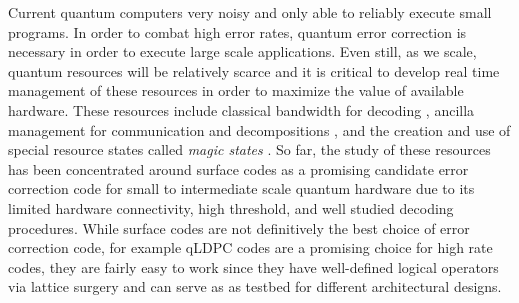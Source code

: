 Current quantum computers very noisy and only able to reliably execute small programs. In order to combat high error rates, quantum error correction is necessary in order to execute large scale applications. Even still, as we scale, quantum resources will be relatively scarce and it is critical to develop real time management of these resources in order to maximize the value of available hardware. These resources include classical bandwidth for decoding \cite{ravi2023better}, ancilla management for communication and decompositions \cite{ding2020square}, and the creation and use of special resource states called \textit{magic states} \cite{ding2018magic, litinski2019magic}. So far, the study of these resources has been concentrated around surface codes as a promising candidate error correction code for small to intermediate scale quantum hardware \cite{litinski2019game, gidney2021factor} due to its limited hardware connectivity, high threshold, and well studied decoding procedures. While surface codes are not definitively the best choice of error correction code, for example qLDPC codes \cite{bravyi2023high, xu2023constant} are a promising choice for high rate codes, they are fairly easy to work since they have well-defined logical operators via lattice surgery \cite{horsman2012surface} and can serve as as testbed for different architectural designs.


